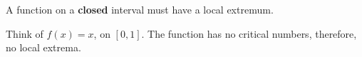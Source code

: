 \documentclass{ximera}
\author{Steven Gubkin\and Nela Lakos}
\begin{document}
\begin{exercise}

	A function on a \textbf{closed} interval must have a local extremum.
	\begin{hint}
 Think of $f(x)=x$, on $[0,1]$. The function has no critical numbers, therefore, no local extrema.
\end{hint}	
	\begin{multipleChoice}
	\end{multipleChoice}


\end{exercise}
\end{document}
